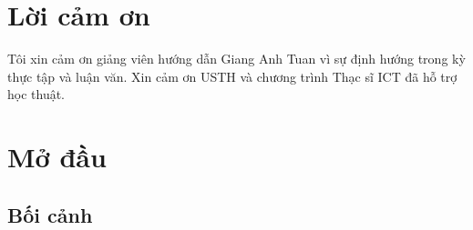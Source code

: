 \documentclass[12pt, a4paper]{report}
\begin{document}
\begin{abstract}
Sau COVID-19, do dự tiêm vaccine (\emph{vaccine hesitancy}) vẫn bị khuếch đại bởi thông tin sai lệch trên mạng xã hội và báo chí số.
Nội dung hiện nay thường đa phương thức (văn bản + hình ảnh), nên bộ phân loại chỉ dựa vào text có thể thiếu tín hiệu thị giác.
Luận văn này xây dựng pipeline Transformer ở mức nội dung để phát hiện misinformation liên quan COVID-19/vaccine, đồng thời phân tích các chủ đề tường thuật gắn với do dự tiêm hậu đại dịch.

Trên bộ CONSTRAINT, RoBERTa đạt macro-F1~$0.9719$ (accuracy~$0.9720$), vượt baseline cổ điển TF--IDF + hồi quy logistic ($0.9224$).
Trên MMCoVaR (tin tức có ảnh), ablation cho thấy text chiếm ưu thế (macro-F1~$\approx 0.963$), ảnh yếu ($\approx 0.554$), và late fusion gần như bằng text ($\approx 0.963$) --- ảnh gần như không mang lại lợi ích rõ.
BERTopic trên $5{,}752$ văn bản misinfo tạo taxonomy chủ đề: số ca/tử vong giật gân, chính trị hóa, khẩu trang, nguồn gốc lab/China, thuốc ``thần'', Bill Gates, hình ảnh bệnh viện, trẻ em/trường học, bài thuốc dân gian, tin đồn cấm đi lại.

Đóng góp gồm pipeline tái lập được, bằng chứng đóng góp từng modality, và bản đồ narrative hỗ trợ truyền thông y tế.
TikTok, Whisper và crawl nền tảng trực tiếp được ghi nhận như hạn chế / hướng nghiên cứu tiếp theo.
\end{abstract}

\clearpage

\chapter*{Lời cảm ơn}
Tôi xin cảm ơn giảng viên hướng dẫn Giang Anh Tuan vì sự định hướng trong kỳ thực tập và luận văn.
Xin cảm ơn USTH và chương trình Thạc sĩ ICT đã hỗ trợ học thuật.

\clearpage
\tableofcontents
\clearpage

\setcounter{page}{1}

\chapter{Mở đầu}
\label{chap:introduction}

\section{Bối cảnh}
\label{sec:context}
\end{document}

